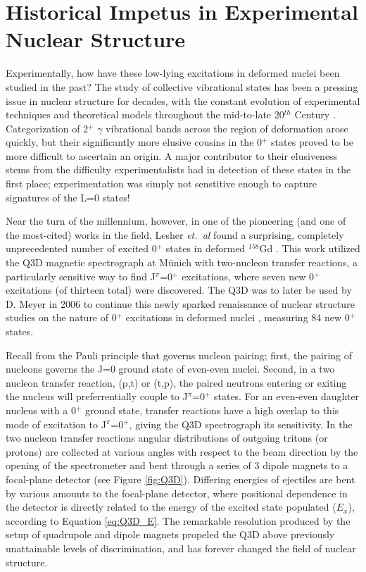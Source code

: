 
\section{Historical Impetus in Experimental Nuclear Structure}\label{sec:study_of_0plus}
Experimentally, how have these low-lying excitations in deformed nuclei been studied in the past? The study of collective vibrational states has been a pressing issue in nuclear structure for decades, with the constant evolution of experimental techniques and theoretical models throughout the mid-to-late 20$^{th}$ Century \cite{Casten_text,PhysRevC.54.679,KORTEN_1993}. Categorization of 2$^+$ $\gamma$ vibrational bands across the region of deformation arose quickly, but their significantly more elusive cousins in the 0$^+$ states proved to be more difficult to ascertain an origin. A major contributor to their elusiveness stems from the difficulty experimentalists had in detection of these states in the first place; experimentation was simply not senstitive enough to capture signatures of the L=0 states! 

Near the turn of the millennium, however, in one of the pioneering (and one of the most-cited) works in the field, Lesher \textit{et.~al} found a surprising, completely unprecedented number of excited 0$^+$ states in deformed $^{158}$Gd \cite{Lesher_158Gdpt}. This work utilized the Q3D magnetic spectrograph at M\"{u}nich with two-nucleon transfer reactions, a particularly sensitive way to find J$^\pi$=0$^+$ excitations, where seven new 0$^+$ excitations (of thirteen total) were discovered. The Q3D was to later be used by D. Meyer in 2006 to continue this newly sparked renaissance of nuclear structure studies on the nature of 0$^+$ excitations in deformed nuclei \cite{Meyer_pt0_2006}, measuring 84 new 0$^+$ states. 

Recall from \cite{Rowe_Wood_text} the Pauli principle that governs nucleon pairing; first, the pairing of nucleons governs the J=0 ground state of even-even nuclei. Second, in a two nucleon transfer reaction, (p,t) or (t,p), the paired neutrons entering or exiting the nucleus will preferrentially couple to J$^\pi$=0$^+$ states. For an even-even daughter nucleus with a 0$^+$ ground state, transfer reactions have a high overlap to this mode of excitation to J$^\pi$=0$^+$, giving the Q3D spectrograph its sensitivity. In the two nucleon transfer reactions angular distributions of outgoing tritons (or protons) are collected at various angles with respect to the beam direction by the opening of the spectrometer and bent through a series of 3 dipole magnets to a focal-plane detector (see Figure \ref{fig:Q3D}). Differing energies of ejectiles are bent by various amounts to the focal-plane detector, where positional dependence in the detector is directly related to the energy of the excited state populated ($E_x$), according to Equation \ref{eq:Q3D_E}. The remarkable resolution produced by the setup of quadrupole and dipole magnets propeled the Q3D above previously unattainable levels of discrimination, and has forever changed the field of nuclear structure.

